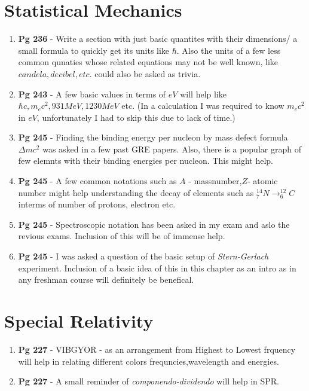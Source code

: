 \documentclass{article}
\begin{document}
\section{Statistical Mechanics}
\begin{enumerate}
\item \textbf{Pg 236} - Write a section with just basic quantites with their dimensions/ a small formula to quickly get its units like $\hbar$. Also the units of a few less common qunaties whose related equations may not be well known, like $candela, decibel, etc.$ could also be asked as trivia.
\item \textbf{Pg 243} - A few basic values in terms of $eV$ will help like $\hbar c, m_ec^2,931 MeV, 1230 MeV$ etc. (In a calculation I was required to know $m_ec^2$ in $eV$, unfortunately I had to skip this due to lack of time.)
\item \textbf{Pg 245} - Finding the binding energy per nucleon by mass defect formula $\Delta m c^2$ was asked in a few past GRE papers. Also, there is a popular graph of few elemnts with their binding energies per nucleon. This might help.
\item \textbf{Pg 245} - A few common notations such as $A$ - massnumber,$Z$- atomic number might help understanding the decay of elements such as $_7^{14}N \rightarrow _6^12 C$ interms of number of protons, electron etc.
\item \textbf{Pg 245} - Spectroscopic notation has been asked in my exam and aslo the revious exams. Inclusion of this will be of immense help.
\item \textbf{Pg 245} - I was asked a question of the basic setup of \textit{Stern-Gerlach} experiment. Inclusion of a basic idea of this in this chapter as an intro as in any freshman course will definitely be benefical.
\end{enumerate}
\section{Special Relativity}
\begin{enumerate}
\item \textbf{Pg 227} - VIBGYOR - as an arrangement from Highest to Lowest frquency will help in relating different colors frequncies,wavelength and energies.
\item \textbf{Pg 227} - A small reminder of \textit{componendo-dividendo} will help in SPR.
\end{enumerate}
\end{document}

